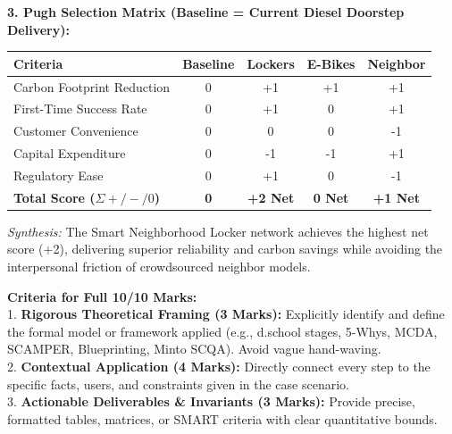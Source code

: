 \begin{solbox}
\textbf{3. Pugh Selection Matrix (Baseline = Current Diesel Doorstep Delivery):}\\
{\small
\begin{tabularx}{\linewidth}{|X|c|c|c|c|} \hline
\textbf{Criteria} & \textbf{Baseline} & \textbf{Lockers} & \textbf{E-Bikes} & \textbf{Neighbor} \\ \hline
Carbon Footprint Reduction & 0 & +1 & +1 & +1 \\ \hline
First-Time Success Rate & 0 & +1 & 0 & +1 \\ \hline
Customer Convenience & 0 & 0 & 0 & -1 \\ \hline
Capital Expenditure & 0 & -1 & -1 & +1 \\ \hline
Regulatory Ease & 0 & +1 & 0 & -1 \\ \hline
\textbf{Total Score ($\Sigma + / - / 0$)} & \textbf{0} & \textbf{+2 Net} & \textbf{0 Net} & \textbf{+1 Net} \\ \hline
\end{tabularx}\par}

\textit{Synthesis:} The Smart Neighborhood Locker network achieves the highest net score (+2), delivering superior reliability and carbon savings while avoiding the interpersonal friction of crowdsourced neighbor models.
\end{solbox}

\begin{examinertip}
\textbf{Criteria for Full 10/10 Marks:}\\
1. \textbf{Rigorous Theoretical Framing (3 Marks):} Explicitly identify and define the formal model or framework applied (e.g., d.school stages, 5-Whys, MCDA, SCAMPER, Blueprinting, Minto SCQA). Avoid vague hand-waving.\\
2. \textbf{Contextual Application (4 Marks):} Directly connect every step to the specific facts, users, and constraints given in the case scenario.\\
3. \textbf{Actionable Deliverables \& Invariants (3 Marks):} Provide precise, formatted tables, matrices, or SMART criteria with clear quantitative bounds.
\end{examinertip}
